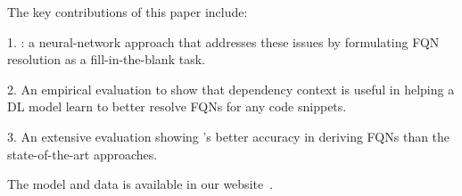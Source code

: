 The key contributions of this paper include:

1. {\tool}: a neural-network approach that addresses these issues by
formulating FQN resolution as a fill-in-the-blank task.

2. An empirical evaluation to show that dependency context is useful
in helping a DL model learn to better resolve FQNs for any code
snippets.

3. An extensive evaluation showing {\tool}'s better accuracy in
deriving FQNs than the state-of-the-art approaches.

The model and data is available in our website~\cite{deepfqn}.
